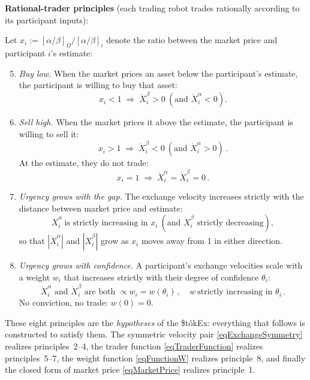 \documentclass[letterpaper]{article}
\newcommand{\priceAB}{\left[\alpha / \beta\right]}
\newcommand{\StokEx}{\$t\^{o}kEx}
\begin{document}
\textbf{Rational-trader principles} (each trading robot trades rationally according to its participant inputs):

Let $x_i := \priceAB_\Omega / \priceAB_i$ denote the ratio between the market price and participant $i$'s estimate:
\begin{enumerate}
    \setcounter{enumi}{4}
    \item \emph{Buy low.} When the market prices an asset below the participant's estimate, the participant is willing to buy that asset:
    \begin{equation*}
        x_i < 1 \;\Longrightarrow\; \dot{X}_i^\beta > 0 \ \left(\text{and } \dot{X}_i^\alpha < 0\right).
    \end{equation*}
    \item \emph{Sell high.} When the market prices it above the estimate, the participant is willing to sell it:
    \begin{equation*}
        x_i > 1 \;\Longrightarrow\; \dot{X}_i^\beta < 0 \ \left(\text{and } \dot{X}_i^\alpha > 0\right)\,.
    \end{equation*}
    At the estimate, they do not trade:
    \begin{equation*}
        x_i = 1 \;\Longrightarrow\; \dot{X}_i^\alpha = \dot{X}_i^\beta = 0\,.
    \end{equation*}
    \item \emph{Urgency grows with the gap.} The exchange velocity increases strictly with the distance between market price and estimate:
    \begin{equation*}
        \dot{X}_i^\alpha \ \text{is strictly increasing in } x_i \ \left(\text{and } \dot{X}_i^\beta \text{ strictly decreasing}\right),
    \end{equation*}
    so that $|\dot{X}_i^\alpha|$ and $|\dot{X}_i^\beta|$ grow as $x_i$ moves away from 1 in either direction.
    \item \emph{Urgency grows with confidence.} A participant's exchange velocities scale with a weight $w_i$ that increases strictly with their degree of confidence $\theta_i$:
    \begin{equation*}
        \dot{X}_i^\alpha\text{ and }\dot{X}_i^\beta\text{ are both }\propto w_i = w(\theta_i)\,, \quad w \ \text{strictly increasing in } \theta_i\,.
    \end{equation*}
    No conviction, no trade: $w(0) = 0$.
\end{enumerate}

These eight principles are the \emph{hypotheses} of the \StokEx{}: everything that follows is constructed to satisfy them.
The symmetric velocity pair \eqref{eqExchangeSymmetry} realizes principles~2--4,
the trader function \eqref{eqTraderFunction} realizes principles~5--7, the weight function \eqref{eqFunctionW} realizes principle~8,
and finally the closed form of market price \eqref{eqMarketPrice} realizes principle~1.
\end{document}
